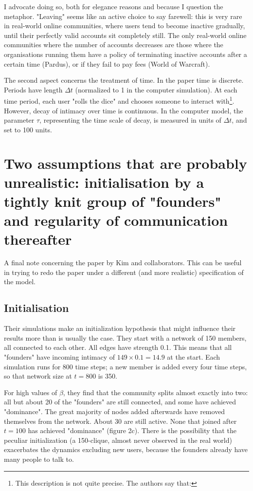 \documentclass{article}
\begin{document}
I advocate doing so, both for elegance reasons and because I question the metaphor. "Leaving" seems like an active choice to say farewell: this is very rare in real-world online communities, where users tend to become inactive gradually, until their perfectly valid accounts sit completely still. The only real-world online communities where the number of accounts decreases are those where the organisations running them have a policy of terminating inactive accounts after a certain time (Pardus), or if they fail to pay fees (World of Warcraft). 

The second aspect concerns the treatment of time. In the paper time is discrete. Periods have length $\Delta t$ (normalized to 1 in the computer simulation). At each time period, each user "rolls the dice" and chooses someone to interact with\footnote{This description is not quite precise. The authors say that:  }. However, decay of intimacy over time is continuous. In the computer model, the parameter $\tau$, representing the time scale of decay, is measured in units of $\Delta t$, and set to 100 units.  
 

\section{Two assumptions that are probably unrealistic: initialisation by a tightly knit group of "founders" and regularity of communication thereafter}

A final note concerning the paper by Kim and collaborators. This can be useful in trying to redo the paper under a different (and more realistic) specification of the model.

\subsection{Initialisation}

Their simulations make an initialization hypothesis that might influence their results more than is usually the case. They start with a network of 150 members, all connected to each other. All edges have strength 0.1. This means that all "founders" have incoming intimacy of $149 \times 0.1 = 14.9$ at the start. Each simulation runs for 800 time steps; a new member is added every four time steps, so that network size at $t = 800$ is 350. 

For high values of $\beta$, they find that the community splits almost exactly into two: all but about 20 of the "founders" are still connected, and some have achieved "dominance". The great majority of nodes added afterwards have removed themselves from the network. About 30 are still active. None that joined after $t = 100$ has achieved "dominance" (figure 2c). There is the possibility that the peculiar initialization (a 150-clique, almost never observed in the real world) exacerbates the dynamics excluding new users, because the founders already have many people to talk to. 
\end{document}
